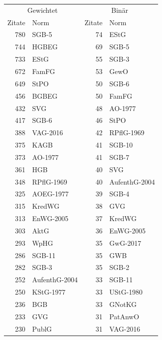 \begin{tabular}{rl|rl}
\multicolumn{2}{c}{Gewichtet} & \multicolumn{2}{|c}{Binär} \\
Zitate & Norm & Zitate & Norm \\
\midrule
780 & SGB-5 & 74 & EStG \\
744 & HGBEG & 69 & SGB-5 \\
733 & EStG & 55 & SGB-3 \\
672 & FamFG & 53 & GewO \\
649 & StPO & 50 & SGB-6 \\
456 & BGBEG & 50 & FamFG \\
432 & SVG & 48 & AO-1977 \\
417 & SGB-6 & 46 & StPO \\
388 & VAG-2016 & 42 & RPflG-1969 \\
375 & KAGB & 41 & SGB-10 \\
373 & AO-1977 & 41 & SGB-7 \\
361 & HGB & 40 & SVG \\
348 & RPflG-1969 & 40 & AufenthG-2004 \\
325 & AOEG-1977 & 39 & SGB-4 \\
315 & KredWG & 38 & GVG \\
313 & EnWG-2005 & 37 & KredWG \\
303 & AktG & 36 & EnWG-2005 \\
293 & WpHG & 35 & GwG-2017 \\
286 & SGB-11 & 35 & GWB \\
282 & SGB-3 & 35 & SGB-2 \\
252 & AufenthG-2004 & 33 & SGB-11 \\
250 & KStG-1977 & 33 & UStG-1980 \\
236 & BGB & 33 & GNotKG \\
233 & GVG & 31 & PatAnwO \\
230 & PublG & 31 & VAG-2016 \\
\end{tabular}

